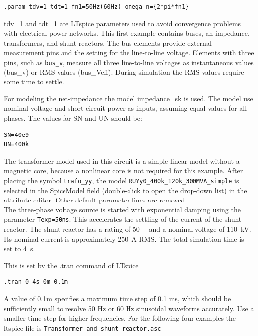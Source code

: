 \begin{lstlisting}[style=LTspice]
	.param tdv=1 tdt=1 fn1=50Hz(60Hz) omega_n={2*pi*fn1}
\end{lstlisting}

\noindent tdv=1 and tdt=1 are LTspice parameters used to avoid convergence problems with electrical power networks.
This first example contains buses, an impedance, transformers, and shunt reactors. The bus elements provide external measurement pins and the setting for the line-to-line voltage. Elements with three pins, such as \texttt{bus\_v}, measure all three line-to-line voltages as instantaneous values (bus\_v) or RMS values (bus\_Veff). During simulation the RMS values require some time to settle.

For modeling the net-impedance the model impedance\_sk is used. The model use nominal voltage and short-circuit power as inputs, assuming equal values for all phases. The values for SN and UN should be:\\
\newpage

\begin{lstlisting}[style=LTspice]
SN=40e9
UN=400k
\end{lstlisting}

The transformer model used in this circuit is a simple linear model without a magnetic core, because a nonlinear core is not required for this example. After placing the symbol \texttt{trafo\_yy}, the model \texttt{RUYy0\_400k\_120k\_300MVA\_simple} is selected in the SpiceModel field (double-click to open the drop-down list) in the attribute editor. Other default parameter lines are removed.\\

The three-phase voltage source is started with exponential damping using the parameter \texttt{Texp=50ms}. This accelerates the settling of the current of the shunt reactor. The shunt reactor has a rating of \SI{50}{\mega\varunit} and a nominal voltage of \SI{110}{\kilo\volt}. Its nominal current is approximately \SI{250}{\ampere} RMS. The total simulation time is set to \SI{4}{\second}.

\noindent This is set by the .tran command of LTspice

\begin{lstlisting}[style=LTspice]
.tran 0 4s 0m 0.1m
\end{lstlisting}
A value of 0.1m specifies a maximum time step of 0.1 ms, which should be sufficiently small to resolve 50 Hz or 60 Hz sinusoidal waveforms accurately. Use a smaller time step for higher frequencies. For the following four examples the ltspice file is 
\texttt{Transformer\_and\_shunt\_reactor.asc}

